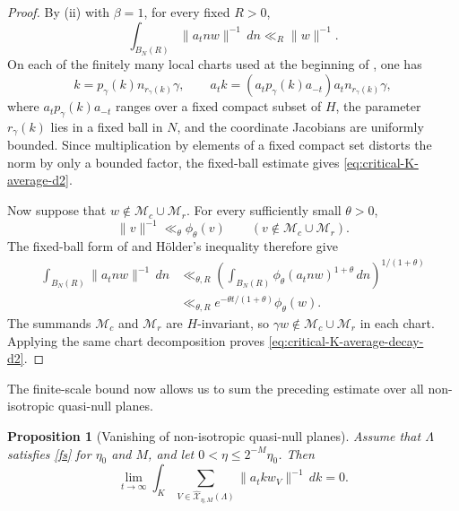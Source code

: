 \documentclass[reqno,11pt]{amsart}
\newtheorem{prop}[prop]{Proposition}
\theoremstyle{definition}
\theoremstyle{remark}
\numberwithin{equation}{section}
\begin{document}
\begin{proof}
By \textnormal{(ii)} with $\beta=1$, for
every fixed $R>0$,
$$
\int_{B_N(R)}
\|a_tnw\|^{-1}\,dn
\ll_R
\|w\|^{-1}.
$$
On each of the finitely many local charts used at the beginning of
\cite[Subsection~7.2]{Kim}, one has
$$
k=p_\gamma(k)n_{r_\gamma(k)}\gamma,
\qquad
a_tk
=
(a_tp_\gamma(k)a_{-t})
a_tn_{r_\gamma(k)}\gamma,
$$
where $a_tp_\gamma(k)a_{-t}$ ranges over a fixed compact subset of $H$,
the parameter $r_\gamma(k)$ lies in a fixed ball in $N$, and the coordinate
Jacobians are uniformly bounded. Since multiplication by elements of a
fixed compact set distorts the norm by only a bounded factor, the
fixed-ball estimate gives \eqref{eq:critical-K-average-d2}.

Now suppose that
$w\notin\mathcal M_c\cup\mathcal M_r$. For every sufficiently small
$\theta>0$,
$$
\|v\|^{-1}
\ll_\theta
\phi_\theta(v)
\qquad
\left(
v\notin\mathcal M_c\cup\mathcal M_r
\right).
$$
The fixed-ball form of  and H\"older's
inequality therefore give
$$
\begin{aligned}
\int_{B_N(R)}
\|a_tnw\|^{-1}\,dn
&\ll_{\theta,R}
\left(
\int_{B_N(R)}
\phi_\theta(a_tnw)^{1+\theta}\,dn
\right)^{1/(1+\theta)}\\
&\ll_{\theta,R}
e^{-\theta t/(1+\theta)}\phi_\theta(w).
\end{aligned}
$$
The summands $\mathcal M_c$ and $\mathcal M_r$ are $H$-invariant, so
$\gamma w\notin\mathcal M_c\cup\mathcal M_r$ in each chart. Applying the
same chart decomposition proves
\eqref{eq:critical-K-average-decay-d2}.
\end{proof}

The finite-scale bound now allows us to sum the preceding estimate over
all non-isotropic quasi-null planes.

\begin{prop}[Vanishing of non-isotropic quasi-null planes]
\label{prop:nonisotropic-quasinull-vanishing-d2}
Assume that $\Lambda$ satisfies \eqref{fs} for $\eta_0$ and $M$, and let
$0<\eta\le2^{-M}\eta_0$. Then
\begin{equation}\label{eq:nonisotropic-quasinull-vanishing-d2}
\lim_{t\to\infty}
\int_K
\sum_{V\in\widehat{\mathcal X}_{\eta,M}(\Lambda)}
\|a_tkw_V\|^{-1}\,dk
=
0.
\end{equation}
\end{prop}
\end{document}

